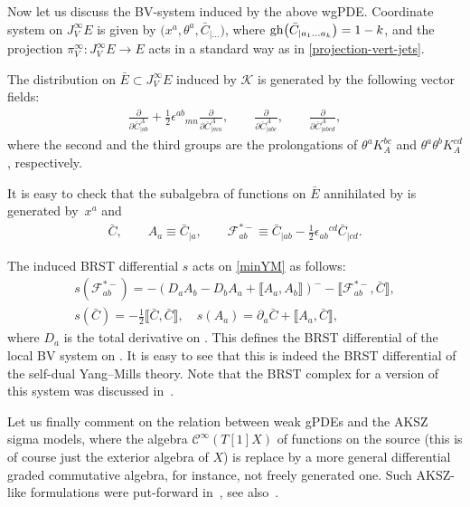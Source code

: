 \documentclass[pdftex]{sigma}
\numberwithin{equation}{section}
\theoremstyle{definition}
\renewcommand{\tilde}{\widetilde}
\newcommand{\cC}{\mathcal{C}}
\def\cK{\mathcal{K}}
\newcommand{\lb}{\llbracket}
\newcommand{\rb}{\rrbracket}
\newcommand{\vprol}{\tilde}
\begin{document}
Now let us discuss the BV-system induced by the above wgPDE. Coordinate system on $J^{\infty}_VE$ is given by $\bigl(x^a,\theta^a,\bar{C}_{|\dots}\bigr)$, where ${\rm gh}\bigl(\bar{C}_{|a_1\dots a_k}\bigr)=1-k$, and the projection $\pi^{\infty}_{V}\colon J^{\infty}_V E\rightarrow E$ acts in a standard way as in \eqref{projection-vert-jets}.

The distribution \smash{$\vprol{\cK}_0$} on $\bar E\subset J^\infty_VE$ induced by $\cK$ is generated by the following vector fields:
\begin{gather*}
 \frac{\partial}{\partial \bar{C}^A_{|ab}}+\frac{1}{2}\epsilon^{ab}_{\,\,\,\,\,\,mn}\frac{\partial}{\partial \bar{C}^A_{|mn}},
 \qquad \frac{\partial}{\partial \bar{C}^A_{|abc}},
 \qquad \frac{\partial}{\partial \bar{C}^A_{|abcd}},
\end{gather*}
where the second and the third groups are the prolongations of $\theta^aK^{bc}_A$ and $\theta^a\theta^bK^{cd}_A$, respectively.

It is easy to check that the subalgebra of functions on $\bar{E}$ annihilated by \smash{$\vprol{\cK}_0$} is generated by~$x^a$ and
\begin{gather*}
 \bar{C},\qquad A_a\equiv \bar{C}_{|a},\qquad
 \mathcal{F}^{*-}_{ab}\equiv \bar{C}_{|ab}-\frac{1}{2}\epsilon_{ab}{}^{cd}\bar{C}_{|cd}.\label{minYM}
 \end{gather*}

The induced BRST differential $s$ acts on \eqref{minYM} as follows:
\begin{gather*}%
 s( \mathcal{F}^{*-}_{ab})=-(D_aA_b-D_bA_a+\lb A_a,A_b\rb)^{-}-\lb\mathcal{F}^{*-}_{ab},\bar{C}\rb,\\
 s(\bar{C})=-\frac{1}{2}\lb\bar{C},\bar{C}\rb,\quad s(A_a)=\partial_a\bar{C}+\lb A_a,\bar{C}\rb,
\end{gather*}
where $D_a$ is the total derivative on \smash{$J^\infty \bigl(\bar E/\vprol{\cK}_0\bigr)$}. This defines the BRST differential of the local BV system on \smash{$J^\infty \bigl(\bar E/\vprol{\cK}_0\bigr)$}. It is easy to see that this is indeed the BRST differential of the self-dual Yang--Mills theory. Note that the BRST complex for a version of this system was discussed in~\cite{Lyakhovich:2007cw}.

Let us finally comment on the relation between weak gPDEs and the AKSZ sigma models, where the algebra $\cC^\infty(T[1]X)$ of functions on the source (this is of course just the exterior algebra of $X$) is replace by a more general differential graded commutative algebra, for instance, not freely generated one. Such AKSZ-like formulations were put-forward in~\cite{costello2011renormalization}, see also~\cite{Bonechi:2022aji,Bonechi:2009kx,Grigoriev:2025vsl}.
\end{document}
